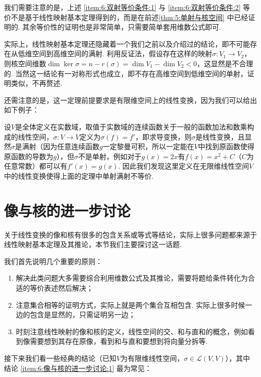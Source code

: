 我们需要注意的是，上述 \ref*{item:6:双射等价条件:1} 与 \ref*{item:6:双射等价条件:2} 等价不是基于线性映射基本定理得到的，而是在前述\autoref{thm:5:单射与核空间} 中已经证明的. 其余等价性的证明也是非常简单，只需要简单套用维数公式即可.

实际上，线性映射基本定理还隐藏着一个我们之前以及介绍过的结论，即不可能存在从低维空间到高维空间的满射. 利用反证法，假设存在这样的映射$\sigma:V_1\to V_2$，则核空间维数$\dim\ker\sigma=n-r(\sigma)=\dim V_1-\dim V_2<0$，这显然是不合理的. 当然这一结论有一对称形式也成立，即不存在高维空间到低维空间的单射，证明类似，不再赘述.

还需注意的是，这一定理前提要求是有限维空间上的线性变换，因为我们可以给出如下例子：

\begin{example}
    设$V$是全体定义在实数域，取值于实数域的连续函数关于一般的函数加法和数乘构成的线性空间，$\sigma:V\to V$定义为$\sigma(f)=f'$，即求导变换，则$\sigma$是线性变换，且显然$\sigma$是满射（因为任意连续函数$g$一定黎曼可积，所以一定能在$V$中找到原函数使得原函数的导数为$g$），但$\sigma$不是单射，例如对于$g(x)=2x$有$f(x)=x^2+C$（$C$为任意常数）都可以有$f'(x)=g(x)$. 因此我们发现这里定义在无限维线性空间$V$中的线性变换使得上面的定理中单射满射不等价.
\end{example}

\section{像与核的进一步讨论}

关于线性变换的像和核有很多的包含关系或等式等结论，实际上很多问题都来源于线性映射基本定理及其推论，本节我们主要探讨这一话题.

我们首先说明几个重要的原则：
\begin{enumerate}
    \item 解决此类问题大多需要综合利用维数公式及其推论，需要将题给条件转化为合适的等价表述然后解决；

    \item 注意集合相等的证明方式，实际上就是两个集合互相包含. 实际上很多时候一边的包含是显然的，只需证明另一边；

    \item 时刻注意线性映射的像和核的定义，线性空间的交、和与直和的概念，例如看到像需要想到其存在原像，看到和与直和要想到将向量分拆等.
\end{enumerate}

接下来我们看一些经典的结论（已知$V$为有限维线性空间，$\sigma\in \mathcal{L}(V,V)$），其中结论 \ref*{item:6:像与核的进一步讨论:1} 最为常见：

